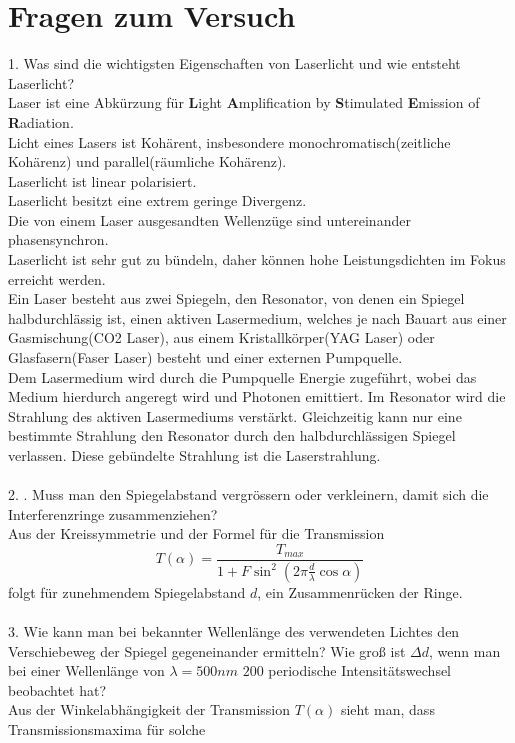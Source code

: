 \documentclass{article}
\begin{document}
\section{Fragen zum Versuch}
1. Was sind die wichtigsten Eigenschaften von Laserlicht und wie entsteht Laserlicht? \\
Laser ist eine Abkürzung für \textbf Light \textbf Amplification by \textbf Stimulated \textbf Emission of \textbf Radiation.\\
Licht eines Lasers ist Kohärent, insbesondere monochromatisch(zeitliche Kohärenz) und parallel(räumliche Kohärenz).\\
Laserlicht ist linear polarisiert.\\
Laserlicht besitzt eine extrem geringe Divergenz.\\
Die von einem Laser ausgesandten Wellenzüge sind untereinander phasensynchron.\\
Laserlicht ist sehr gut zu bündeln, daher können hohe Leistungsdichten im Fokus erreicht werden.\\
Ein Laser besteht aus zwei Spiegeln, den Resonator, von denen ein Spiegel halbdurchlässig ist, einen aktiven Lasermedium, welches je nach Bauart aus einer Gasmischung(CO2 Laser), aus einem Kristallkörper(YAG Laser) oder Glasfasern(Faser Laser) besteht und einer externen Pumpquelle.\\
Dem Lasermedium wird durch die Pumpquelle Energie zugeführt, wobei das Medium hierdurch angeregt wird und Photonen emittiert. Im Resonator wird die Strahlung des aktiven Lasermediums verstärkt. Gleichzeitig kann nur eine bestimmte Strahlung den Resonator durch den halbdurchlässigen Spiegel verlassen. Diese gebündelte Strahlung ist die Laserstrahlung.\\
\\2. . Muss man den Spiegelabstand vergrössern oder verkleinern, damit sich die Interferenzringe
zusammenziehen?\\
Aus der Kreissymmetrie und der Formel für die Transmission
\[
T(\alpha)=\frac{T_{max}}{1+F\sin^{2}(2 \pi\frac{d}{\lambda}\cos\alpha)}
\]
folgt für zunehmendem Spiegelabstand $d$, ein Zusammenrücken der Ringe.\\
\\
3. Wie kann man bei bekannter Wellenlänge des verwendeten Lichtes den Verschiebeweg der Spiegel gegeneinander ermitteln? Wie groß ist $\Delta d$, wenn man bei einer Wellenlänge von $\lambda = 500nm$ $200$ periodische Intensitätswechsel beobachtet hat?\\
Aus der Winkelabhängigkeit der Transmission $T(\alpha)$ sieht man, dass Transmissionsmaxima für solche
\end{document}
